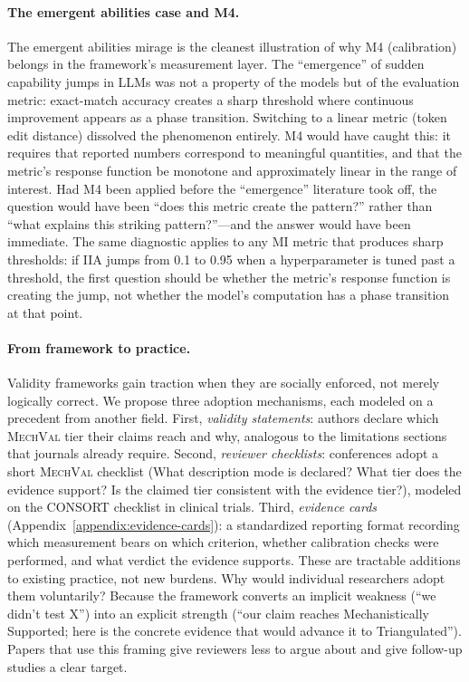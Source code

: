 \documentclass{article}
\newcommand{\mechval}{\textsc{MechVal}}
\begin{document}
\paragraph{The emergent abilities case and M4.}
The \citet{schaeffer2024emergent} emergent abilities mirage is the cleanest illustration of why M4 (calibration) belongs in the framework's measurement layer. The ``emergence'' of sudden capability jumps in LLMs was not a property of the models but of the evaluation metric: exact-match accuracy creates a sharp threshold where continuous improvement appears as a phase transition. Switching to a linear metric (token edit distance) dissolved the phenomenon entirely. M4 would have caught this: it requires that reported numbers correspond to meaningful quantities, and that the metric's response function be monotone and approximately linear in the range of interest. Had M4 been applied before the ``emergence'' literature took off, the question would have been ``does this metric create the pattern?'' rather than ``what explains this striking pattern?''---and the answer would have been immediate. The same diagnostic applies to any MI metric that produces sharp thresholds: if IIA jumps from 0.1 to 0.95 when a hyperparameter is tuned past a threshold, the first question should be whether the metric's response function is creating the jump, not whether the model's computation has a phase transition at that point.

\paragraph{From framework to practice.}
Validity frameworks gain traction when they are socially enforced, not merely logically correct. We propose three adoption mechanisms, each modeled on a precedent from another field. First, \emph{validity statements}: authors declare which \mechval{} tier their claims reach and why, analogous to the limitations sections that journals already require. Second, \emph{reviewer checklists}: conferences adopt a short \mechval{} checklist (What description mode is declared? What tier does the evidence support? Is the claimed tier consistent with the evidence tier?), modeled on the CONSORT checklist in clinical trials. Third, \emph{evidence cards} (Appendix~\ref{appendix:evidence-cards}): a standardized reporting format recording which measurement bears on which criterion, whether calibration checks were performed, and what verdict the evidence supports. These are tractable additions to existing practice, not new burdens. Why would individual researchers adopt them voluntarily? Because the framework converts an implicit weakness (``we didn't test X'') into an explicit strength (``our claim reaches Mechanistically Supported; here is the concrete evidence that would advance it to Triangulated''). Papers that use this framing give reviewers less to argue about and give follow-up studies a clear target.
\end{document}
